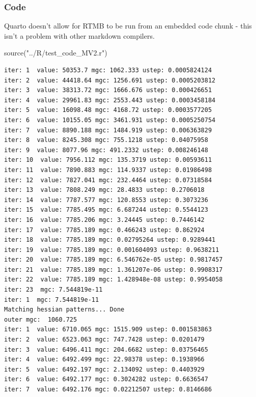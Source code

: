 \documentclass[
  letterpaper,
  DIV=11,
  numbers=noendperiod]{scrartcl}
\newenvironment{Shaded}{\begin{snugshade}}{\end{snugshade}}
\newcommand{\FunctionTok}[1]{\textcolor[rgb]{0.28,0.35,0.67}{#1}}
\newcommand{\NormalTok}[1]{\textcolor[rgb]{0.00,0.23,0.31}{#1}}
\newcommand{\StringTok}[1]{\textcolor[rgb]{0.13,0.47,0.30}{#1}}
\begin{document}
\hypertarget{code}{%
\subsubsection{Code}\label{code}}

Quarto doesn't allow for RTMB to be run from an embedded code chunk -
this isn't a problem with other markdown compilers.

\begin{Shaded}
\begin{Highlighting}[]
\FunctionTok{source}\NormalTok{(}\StringTok{"../R/test\_code\_MV2.r"}\NormalTok{)}
\end{Highlighting}
\end{Shaded}

\begin{verbatim}
iter: 1  value: 50353.7 mgc: 1062.333 ustep: 0.0005824124 
iter: 2  value: 44418.64 mgc: 1256.691 ustep: 0.0005203812 
iter: 3  value: 38313.72 mgc: 1666.676 ustep: 0.000426651 
iter: 4  value: 29961.83 mgc: 2553.443 ustep: 0.0003458184 
iter: 5  value: 16098.48 mgc: 4168.72 ustep: 0.0003577205 
iter: 6  value: 10155.05 mgc: 3461.931 ustep: 0.0005250754 
iter: 7  value: 8890.188 mgc: 1484.919 ustep: 0.006363829 
iter: 8  value: 8245.308 mgc: 755.1218 ustep: 0.04075958 
iter: 9  value: 8077.96 mgc: 491.2332 ustep: 0.008246148 
iter: 10  value: 7956.112 mgc: 135.3719 ustep: 0.00593611 
iter: 11  value: 7890.883 mgc: 114.9337 ustep: 0.01986498 
iter: 12  value: 7827.041 mgc: 232.4464 ustep: 0.07318584 
iter: 13  value: 7808.249 mgc: 28.4833 ustep: 0.2706018 
iter: 14  value: 7787.577 mgc: 120.8553 ustep: 0.3073236 
iter: 15  value: 7785.495 mgc: 6.687244 ustep: 0.5544123 
iter: 16  value: 7785.206 mgc: 3.24445 ustep: 0.7446142 
iter: 17  value: 7785.189 mgc: 0.466243 ustep: 0.862924 
iter: 18  value: 7785.189 mgc: 0.02795264 ustep: 0.9289441 
iter: 19  value: 7785.189 mgc: 0.001604093 ustep: 0.9638211 
iter: 20  value: 7785.189 mgc: 6.546762e-05 ustep: 0.9817457 
iter: 21  value: 7785.189 mgc: 1.361207e-06 ustep: 0.9908317 
iter: 22  value: 7785.189 mgc: 1.428948e-08 ustep: 0.9954058 
iter: 23  mgc: 7.544819e-11 
iter: 1  mgc: 7.544819e-11 
Matching hessian patterns... Done
outer mgc:  1060.725 
iter: 1  value: 6710.065 mgc: 1515.909 ustep: 0.001583863 
iter: 2  value: 6523.063 mgc: 747.7428 ustep: 0.0201479 
iter: 3  value: 6496.411 mgc: 204.6682 ustep: 0.03756465 
iter: 4  value: 6492.499 mgc: 22.98378 ustep: 0.1938966 
iter: 5  value: 6492.197 mgc: 2.134092 ustep: 0.4403929 
iter: 6  value: 6492.177 mgc: 0.3024282 ustep: 0.6636547 
iter: 7  value: 6492.176 mgc: 0.02212507 ustep: 0.8146686 

\end{verbatim}
\end{document}
